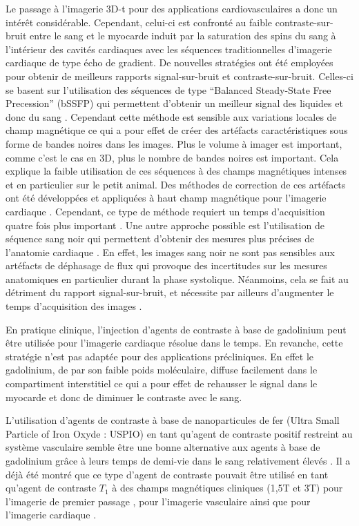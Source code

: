 Le passage à l'imagerie 3D-t pour des applications cardiovasculaires a donc un intérêt considérable. Cependant, celui-ci est confronté au faible contraste-sur-bruit entre le sang et le myocarde induit par la saturation des spins du sang à l'intérieur des cavités cardiaques avec les séquences traditionnelles d'imagerie cardiaque de type écho de gradient. 
De nouvelles stratégies ont été employées pour obtenir de meilleurs rapports signal-sur-bruit et contraste-sur-bruit. Celles-ci se basent sur l’utilisation des séquences de type “Balanced Steady-State Free Precession” (bSSFP) qui permettent d’obtenir un meilleur signal des liquides et donc du sang \cite{Nezafat2008Inflow-quantifi}. Cependant cette méthode est sensible aux variations locales de champ magnétique ce qui a pour effet de créer des artéfacts caractéristiques sous forme de bandes noires dans les images. Plus le volume à imager est important, comme c’est le cas en 3D, plus le nombre de bandes noires est important. Cela explique la faible utilisation de ces séquences à des champs magnétiques intenses et en particulier sur le petit animal. Des méthodes de correction de ces artéfacts ont été développées \cite{Bangerter:2004kq} et appliquées à haut champ magnétique pour l’imagerie cardiaque \cite{Miraux:2008sf}.  Cependant, ce type de méthode requiert un temps d’acquisition quatre fois plus important \cite{Miraux:2008sf}. 
Une autre approche possible est l'utilisation de séquence sang noir qui permettent d'obtenir des mesures plus précises de l'anatomie cardiaque \cite{Berr2005Black-blood-gra}. En effet, les images sang noir ne sont pas sensibles aux artéfacts de déphasage de flux qui provoque des incertitudes sur les mesures anatomiques en particulier durant la phase systolique. Néanmoins, cela se fait au détriment du rapport signal-sur-bruit, et nécessite par ailleurs d’augmenter le temps d’acquisition des images  \cite{Miraux:2009rm}.

En pratique clinique, l’injection d’agents de contraste à base de gadolinium peut être utilisée pour l’imagerie cardiaque résolue dans le temps. En revanche, cette stratégie n’est pas adaptée pour des applications précliniques. En effet le gadolinium, de par son faible poids moléculaire, diffuse facilement dans le compartiment interstitiel ce qui a pour effet de rehausser le signal dans le myocarde et donc de diminuer le contraste avec le sang.

L’utilisation d’agents de contraste à base de nanoparticules de fer (Ultra Small Particle of Iron Oxyde : USPIO) en tant qu’agent de contraste positif restreint au système vasculaire semble être une bonne alternative aux agents à base de gadolinium grâce à leurs temps de demi-vie dans le sang relativement élevés  \cite{Corot:2006fk,Neuwelt:2009aa}. Il a déjà été montré que ce type d’agent de contraste pouvait être utilisé en tant qu’agent de contraste $T_1$ à des champs magnétiques cliniques (1,5T et 3T) pour l’imagerie de premier passage \cite{Li:2005uq}, pour l'imagerie vasculaire \cite{Sigovan:2009aa,Nayak:2014aa} ainsi que pour l'imagerie cardiaque \cite{Amano:2000aa}.

